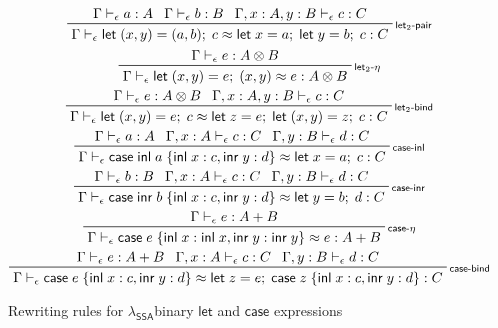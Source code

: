 \documentclass[acmsmall,screen,review]{acmart}
\newcommand{\ms}[1]{\ensuremath{\mathsf{#1}}}
\newcommand{\lto}{:}
\newcommand{\linl}[1]{\ms{inl}\;{#1}}
\newcommand{\linr}[1]{\ms{inr}\;{#1}}
\newcommand{\letexpr}[3]{\ensuremath{\ms{let}\;#1 = #2;\;#3}}
\newcommand{\caseexpr}[5]{\ms{case}\;#1\;\{\linl{#2} \lto #3, \linr{#4} \lto #5\}}
\newcommand{\bhyp}[2]{#1 : #2}
\newcommand{\rle}[1]{{\scriptsize\textsf{#1}}}
\newcommand{\hasty}[4]{#1 \vdash_{#2} #3: {#4}}
\newcommand{\teqv}{\approx}
\newcommand{\tmeq}[5]{#1 \vdash_{#2} #3 \teqv #4 : {#5}}
\newcommand{\isotopessa}{\(\lambda_{\ms{SSA}}\)}
\begin{document}
\begin{figure}
  \begin{gather*}
    \prftree[r]{\rle{let$_2$-pair}}
      {\hasty{\Gamma}{\epsilon}{a}{A}}
      {\hasty{\Gamma}{\epsilon}{b}{B}}
      {\hasty{\Gamma, \bhyp{x}{A}, \bhyp{y}{B}}{\epsilon}{c}{C}}
      {\tmeq{\Gamma}{\epsilon}{\letexpr{(x, y)}{(a, b)}{c}}{\letexpr{x}{a}{\letexpr{y}{b}{c}}}{C}}
    \\
    \prftree[r]{\rle{let$_2$-$\eta$}}
      {\hasty{\Gamma}{\epsilon}{e}{A \otimes B}}
      {\tmeq{\Gamma}{\epsilon}{\letexpr{(x, y)}{e}{(x, y)}}{e}{A \otimes B}} 
    \\
    \prftree[r]{\rle{let$_2$-bind}}
      {\hasty{\Gamma}{\epsilon}{e}{A \otimes B}}
      {\hasty{\Gamma, \bhyp{x}{A}, \bhyp{y}{B}}{\epsilon}{c}{C}}
      {\tmeq{\Gamma}{\epsilon}
        {\letexpr{(x, y)}{e}{c}}
        {\letexpr{z}{e}{\letexpr{(x, y)}{z}{c}}}{C}}
    \\
    \prftree[r]{\rle{case-inl}}
      {\hasty{\Gamma}{\epsilon}{a}{A}}
      {\hasty{\Gamma, \bhyp{x}{A}}{\epsilon}{c}{C}}
      {\hasty{\Gamma, \bhyp{y}{B}}{\epsilon}{d}{C}}
      {\tmeq{\Gamma}{\epsilon}{\caseexpr{\linl{a}}{x}{c}{y}{d}}{\letexpr{x}{a}{c}}{C}}
    \\
    \prftree[r]{\rle{case-inr}}
      {\hasty{\Gamma}{\epsilon}{b}{B}}
      {\hasty{\Gamma, \bhyp{x}{A}}{\epsilon}{c}{C}}
      {\hasty{\Gamma, \bhyp{y}{B}}{\epsilon}{d}{C}}
      {\tmeq{\Gamma}{\epsilon}{\caseexpr{\linr{b}}{x}{c}{y}{d}}{\letexpr{y}{b}{d}}{C}}
    \\
    \prftree[r]{\rle{case-$\eta$}}
      {\hasty{\Gamma}{\epsilon}{e}{A + B}}
      {\tmeq{\Gamma}{\epsilon}{\caseexpr{e}{x}{\linl{x}}{y}{\linr{y}}}{e}{A + B}}
    \\
    \prftree[r]{\rle{case-bind}}
      {\hasty{\Gamma}{\epsilon}{e}{A + B}}
      {\hasty{\Gamma, \bhyp{x}{A}}{\epsilon}{c}{C}}
      {\hasty{\Gamma, \bhyp{y}{B}}{\epsilon}{d}{C}}
      {\tmeq{\Gamma}{\epsilon}{\caseexpr{e}{x}{c}{y}{d}}
      {\letexpr{z}{e}{\caseexpr{z}{x}{c}{y}{d}}}{C}}
  \end{gather*}
  \Description{}
  \caption{Rewriting rules for \isotopessa binary \ms{let} and \ms{case} expressions}
  \label{fig:ssa-let2-case-expr}
\end{figure}
\end{document}
